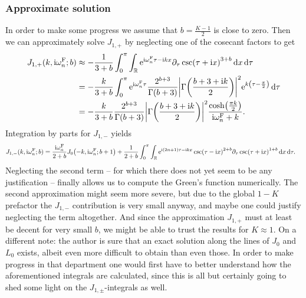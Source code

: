 \documentclass[english, parskip=full]{scrartcl}
\begin{document}
\subsubsection{Approximate solution}
In order to make some progress we assume that $b=\frac{K-1}{2}$ is close to zero.
Then we can approximately solve $J_{1,+}$ by neglecting one of the cosecant factors to get
\begin{align}
J_{1,+}(k,\i\omega_n^\F;b) &\approx -\frac{1}{3+b}\intx{0}{\pi}{\intr{\powe{\i \omega_n^\F \tau - \i kx} \partial_\tau \csc(\tau + \i x)^{3+b}}{x} }{\tau}\\
&= -\frac{k}{3+b} \intx{0}{\pi}{\powe{\i \omega_n^\F \tau} \frac{2^{b+3}}{\Gamma(b+3)} \abs*{\Gamma\kla*{\frac{b+3+\i k}{2}}}^2 \powe{k\kla*{\tau - \frac{\pi}{2}}}  }{\tau}\\
&= -\frac{k}{3+b} \frac{2^{b+3}}{\Gamma(b+3)} \abs*{\Gamma\kla*{\frac{b+3+\i k}{2}}}^2 \frac{\cosh\kla*{\frac{\pi k}{2}}}{\i\omega_n^\F + k}.
\end{align}
Integration by parts for $J_{1,-}$ yields
\begin{align}
J_{1,-}(k,\i\omega_n^\F;b) &= \frac{\i\omega_n^\F}{2+b} J_0\kla*{-k,\i\omega_n^\F;b+1} + \frac{1}{2+b} \intx{0}{\pi}{\intr{\powe{\i (2n+1)\tau - \i kx} \csc\kla*{\tau - \i x}^{2+b} \partial_\tau \csc\kla*{\tau + \i x}^{1+b} }{x} }{\tau}.
\end{align}
Neglecting the second term -- for which there does not yet seem to be any justification -- finally allows us to compute the Green's function numerically.
The second approximation might seem more severe, but due to the global $1-K$ prefactor the $J_{1,-}$ contribution is very small anyway, and maybe one could justify neglecting the term altogether.
And since the approximation $J_{1,+}$ must at least be decent for very small $b$, we might be able to trust the results for $K\approx 1$.
On a different note: the author is sure that an exact solution along the lines of $J_0$ and $L_0$ exists, albeit even more difficult to obtain than even those.
In order to make progress in that department one would first have to better understand how the aforementioned integrals are calculated, since this is all but certainly going to shed some light on the $J_{1,\pm}$-integrals as well.
\end{document}
